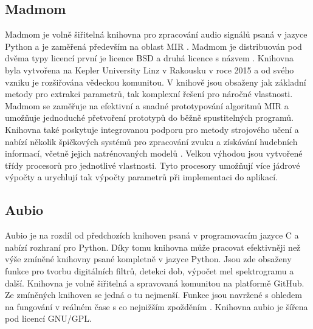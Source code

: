   
    
\subsection{Madmom}
Madmom je volně šiřitelná knihovna pro zpracování audio signálů psaná v jazyce Python a je zaměřená především na oblast \acs{MIR} \cite{madmom}. Madmom je distribuován pod dvěma typy licencí první je licence BSD a druhá licence s názvem . Knihovna byla vytvořena na Kepler University Linz v Rakousku v roce 2015 a od svého vzniku je rozšiřována vědeckou komunitou. V knihově jsou obsaženy jak základní metody pro extrakci parametrů, tak komplexní řešení pro náročné vlastnosti. Madmom se zaměřuje na efektivní a snadné prototypování algoritmů MIR a umožňuje jednoduché přetvoření prototypů do běžně spustitelných programů. Knihovna také poskytuje integrovanou podporu pro metody strojového učení a nabízí několik špičkových systémů pro zpracování zvuku a získávání hudebních informací, včetně jejich natrénovaných modelů \cite{madmom_paper}. Velkou výhodou jsou vytvořené třídy procesorů pro jednotlivé vlastnosti. Tyto procesory umožňují více jádrové výpočty a urychlují tak výpočty parametrů při implementaci do aplikací. 

\subsection{Aubio}
Aubio je na rozdíl od předchozích knihoven psaná v programovacím jazyce C a nabízí rozhraní pro Python. Díky tomu knihovna může pracovat efektivněji než výše zmíněné knihovny psané kompletně v jazyce Python. Jsou zde obsaženy funkce pro tvorbu digitálních filtrů, detekci dob, výpočet mel spektrogramu a další. Knihovna je volně šiřitelná a spravovaná komunitou na platformě GitHub. Ze zmíněných knihoven se jedná o tu nejmenší. Funkce jsou navržené s ohledem na fungování v reálném čase s co nejnižším zpožděním \cite{Aubio}. Knihovna aubio je šířena pod licencí GNU/GPL.

